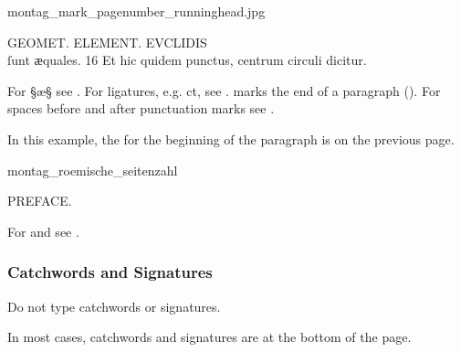 \begin{sampleImage}{montag_mark_pagenumber_runninghead.jpg}

\begin{typeLatin}
GEOMET. ELEMENT. EVCLIDIS \\
ſunt ӕquales. 16 Et hic quidem punctus, centrum circuli dicitur. \\
\untranscribedText
\end{typeLatin}
\end{sampleImage}

\begin{crossref}
For §æ§ see . For ligatures, e.g. { ct}, see .  marks the end of a paragraph (). For spaces before and after punctuation marks see .
\end{crossref}

\begin{note}
In this example, the  for the beginning of the paragraph is on the previous page.
\end{note}

\vspace{3mm}
\begin{sampleImage}{montag_roemische_seitenzahl}
\begin{typeLatin}
PREFACE.
\end{typeLatin}
\end{sampleImage}

\begin{crossref}
For  and  see .
\end{crossref}

\subsubsection{Catchwords and Signatures}
\label{section catchwords and signatures}

\begin{mainrule}
Do not type catchwords or signatures.
\end{mainrule}

\begin{clarification}
In most cases, catchwords and signatures are at the bottom of the page.
\end{clarification}

